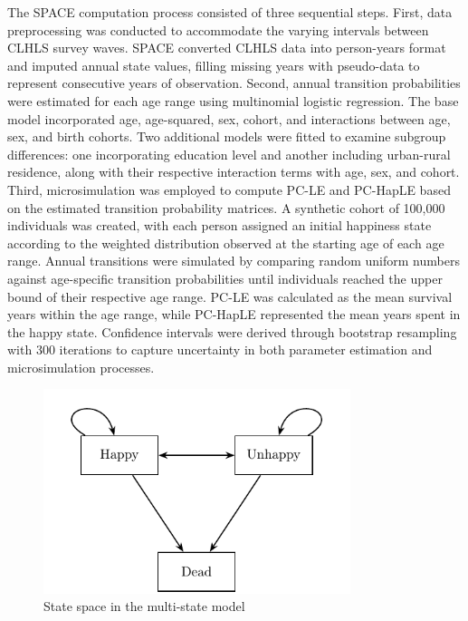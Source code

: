 \documentclass[12pt, a4paper]{article}
\begin{document}
The SPACE computation process consisted of three sequential steps. First, data preprocessing was conducted to accommodate the varying intervals between CLHLS survey waves. SPACE converted CLHLS data into person-years format and imputed annual state values, filling missing years with pseudo-data to represent consecutive years of observation. Second, annual transition probabilities were estimated for each age range using multinomial logistic regression. The base model incorporated age, age-squared, sex, cohort, and interactions between age, sex, and birth cohorts. Two additional models were fitted to examine subgroup differences: one incorporating education level and another including urban-rural residence, along with their respective interaction terms with age, sex, and cohort. Third, microsimulation was employed to compute PC-LE and PC-HapLE based on the estimated transition probability matrices. A synthetic cohort of 100,000 individuals was created, with each person assigned an initial happiness state according to the weighted distribution observed at the starting age of each age range. Annual transitions were simulated by comparing random uniform numbers against age-specific transition probabilities until individuals reached the upper bound of their respective age range. PC-LE was calculated as the mean survival years within the age range, while PC-HapLE represented the mean years spent in the happy state. Confidence intervals were derived through bootstrap resampling with 300 iterations to capture uncertainty in both parameter estimation and microsimulation processes.

\begin{figure}[htbp]
  \centering
  \includegraphics[width=0.8\textwidth]{fig_tabs_b300/latex_output/State_space.pdf}
  \caption{State space in the multi-state model}
  \label{fig:State_space}
\end{figure}
\end{document}
